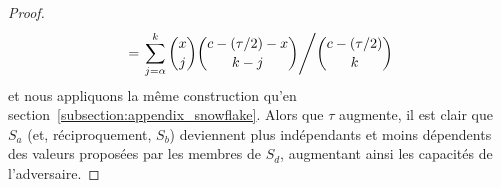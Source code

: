 \documentclass[a4,twocolumn,10pt]{article}
\theoremstyle{definition}
\begin{document}
\begin{appendices}
{\begin{proof}
\begin{equation}
\begin{split}
&= \left.\sum_{j = \alpha}^{k} {x \choose j}{c-(\tau/2)-x \choose k-j}\middle/{c - (\tau/2) \choose k}\right.\\
\end{split}
\end{equation}
et nous appliquons la même construction qu'en section~\ref{subsection:appendix_snowflake}. Alors que $\tau$ augmente, il est clair que $S_a$ (et, réciproquement, $S_b$) deviennent plus indépendants et moins dépendents des valeurs proposées par les membres de $S_d$, augmentant ainsi les capacités de l'adversaire.
\end{proof}


}





\end{appendices}
\end{document}
